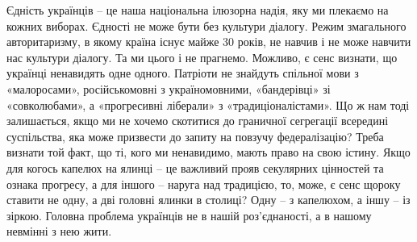 Єдність українців – це наша національна ілюзорна надія, яку ми плекаємо на
кожних виборах. Єдності не може бути без культури діалогу. Режим змагального
авторитаризму, в якому країна існує майже 30 років, не навчив і не може навчити
нас культури діалогу. Та ми цього і не прагнемо. Можливо, є сенс визнати, що
українці ненавидять одне одного. Патріоти не знайдуть спільної мови з
«малоросами», російськомовні з україномовними, «бандерівці» зі «совколюбами», а
«прогресивні ліберали» з «традиціоналістами». Що ж нам тоді залишається, якщо
ми не хочемо скотитися до граничної сегрегації всередині суспільства, яка може
призвести до запиту на повзучу федералізацію? Треба визнати той факт, що ті,
кого ми ненавидимо, мають право на свою істину. Якщо для когось капелюх на
ялинці – це важливий прояв секулярних цінностей та ознака прогресу, а для
іншого – наруга над традицією, то, може, є сенс щороку ставити не одну, а дві
головні ялинки в столиці? Одну – з капелюхом, а іншу – із зіркою. Головна
проблема українців не в нашій роз’єднаності, а в нашому невмінні з нею жити.

